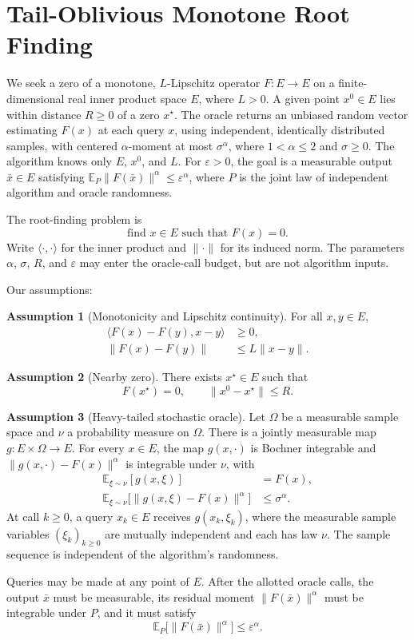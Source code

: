 \documentclass[10pt]{article}
\theoremstyle{definition}
\newtheorem{assumption}{Assumption}
\begin{document}
\section*{Tail-Oblivious Monotone Root Finding}
We seek a zero of a monotone, $L$-Lipschitz operator $F:E\to E$ on a finite-dimensional real inner product space $E$, where $L>0$. A given point $x^0\in E$ lies within distance $R\geq0$ of a zero $x^\star$. The oracle returns an unbiased random vector estimating $F(x)$ at each query $x$, using independent, identically distributed samples, with centered $\alpha$-moment at most $\sigma^\alpha$, where $1<\alpha\leq2$ and $\sigma\geq0$. The algorithm knows only $E$, $x^0$, and $L$. For $\varepsilon>0$, the goal is a measurable output $\bar{x}\in E$ satisfying $\mathbb{E}_{P}\|F(\bar{x})\|^\alpha\leq\varepsilon^\alpha$, where $P$ is the joint law of independent algorithm and oracle randomness.

The root-finding problem is
\[
\text{find }x\in E\text{ such that }F(x)=0.
\]
Write $\langle\cdot,\cdot\rangle$ for the inner product and $\|\cdot\|$ for its induced norm. The parameters $\alpha$, $\sigma$, $R$, and $\varepsilon$ may enter the oracle-call budget, but are not algorithm inputs.

Our assumptions:
\begin{assumption}[Monotonicity and Lipschitz continuity]
For all $x,y\in E$,
\[
\begin{aligned}
\langle F(x)-F(y),x-y\rangle&\geq0,\\
\|F(x)-F(y)\|&\leq L\|x-y\|.
\end{aligned}
\]
\end{assumption}

\begin{assumption}[Nearby zero]
There exists $x^\star\in E$ such that
\[
F(x^\star)=0,
\qquad \|x^0-x^\star\|\leq R.
\]
\end{assumption}

\begin{assumption}[Heavy-tailed stochastic oracle]
Let $\Omega$ be a measurable sample space and $\nu$ a probability measure on $\Omega$. There is a jointly measurable map $g:E\times\Omega\to E$. For every $x\in E$, the map $g(x,\cdot)$ is Bochner integrable and $\|g(x,\cdot)-F(x)\|^\alpha$ is integrable under $\nu$, with
\[
\begin{aligned}
\mathbb{E}_{\xi\sim\nu}[g(x,\xi)]&=F(x),\\
\mathbb{E}_{\xi\sim\nu}\bigl[\|g(x,\xi)-F(x)\|^\alpha\bigr]
&\leq\sigma^\alpha.
\end{aligned}
\]
At call $k\geq0$, a query $x_k\in E$ receives $g(x_k,\xi_k)$, where the measurable sample variables $(\xi_k)_{k\geq0}$ are mutually independent and each has law $\nu$. The sample sequence is independent of the algorithm's randomness.
\end{assumption}

Queries may be made at any point of $E$. After the allotted oracle calls, the output $\bar{x}$ must be measurable, its residual moment $\|F(\bar{x})\|^\alpha$ must be integrable under $P$, and it must satisfy
\[
\mathbb{E}_{P}\bigl[\|F(\bar{x})\|^\alpha\bigr]
\leq\varepsilon^\alpha.
\]
\end{document}
